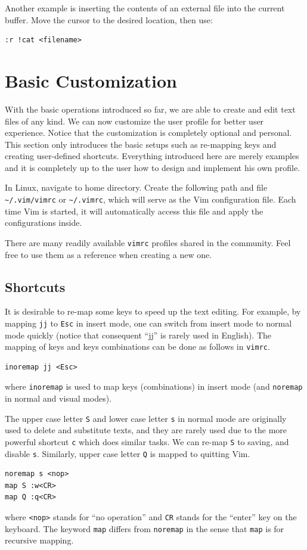 Another example is inserting the contents of an external file into the current buffer. Move the cursor to the desired location, then use:
\begin{lstlisting}
:r !cat <filename>
\end{lstlisting}

\section{Basic Customization}

With the basic operations introduced so far, we are able to create and edit text files of any kind. We can now customize the user profile for better user experience. Notice that the customization is completely optional and personal. This section only introduces the basic setups such as re-mapping keys and creating user-defined shortcuts. Everything introduced here are merely examples and it is completely up to the user how to design and implement his own profile.

In Linux, navigate to home directory. Create the following path and file \verb|~/.vim/vimrc| or \verb|~/.vimrc|, which will serve as the Vim configuration file. Each time Vim is started, it will automatically access this file and apply the configurations inside.

There are many readily available \verb|vimrc| profiles shared in the community. Feel free to use them as a reference when creating a new one.

\subsection{Shortcuts}

It is desirable to re-map some keys to speed up the text editing. For example, by mapping \verb|jj| to \verb|Esc| in insert mode, one can switch from insert mode to normal mode quickly (notice that consequent ``jj'' is rarely used in English). The mapping of keys and keys combinations can be done as follows in \verb|vimrc|.
\begin{lstlisting}
inoremap jj <Esc>
\end{lstlisting}
where \verb|inoremap| is used to map keys (combinations) in insert mode (and \verb|noremap| in normal and visual modes).

The upper case letter \verb|S| and lower case letter \verb|s| in normal mode are originally used to delete and substitute texts, and they are rarely used due to the more powerful shortcut \verb|c| which does similar tasks. We can re-map \verb|S| to saving, and disable \verb|s|. Similarly, upper case letter \verb|Q| is mapped to quitting Vim.
\begin{lstlisting}
noremap s <nop>
map S :w<CR>
map Q :q<CR>
\end{lstlisting}
where \verb|<nop>| stands for ``no operation'' and \verb|CR| stands for the ``enter'' key on the keyboard. The keyword \verb|map| differs from \verb|noremap| in the sense that \verb|map| is for recursive mapping.

